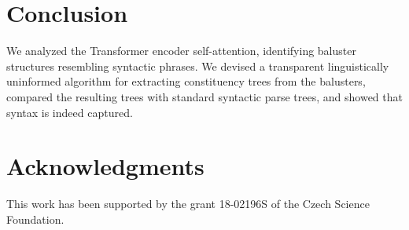 \documentclass[11pt,a4paper]{article}
\newcommand\footurl[1]{\footnote{\url{#1}}}
\def\RR#1{{\color{blue}RR: \it #1}}
\def\DM#1{{\color{red}DM: \it #1}}
\def\DEL#1{{\color{green}SMAZAT: \it #1}}
\def\RR#1{}
\def\DM#1{}
\def\DEL#1{}
\begin{document}
\section{Conclusion}

We analyzed the Transformer encoder self-attention, identifying baluster structures resembling syntactic phrases.
We devised a transparent linguistically uninformed algorithm for extracting constituency trees from the balusters, compared the resulting trees with standard syntactic parse trees,
and showed that syntax is indeed captured.





\section*{Acknowledgments}
This work has been supported by the grant 18-02196S of the Czech
Science Foundation.




\appendix
\end{document}
